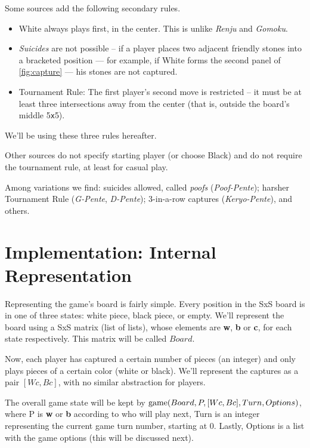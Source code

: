 \documentclass[12pt,a4paper,notitlepage]{article}
\newcommand*{\boardsize}[1]{#1\texttt{x}#1}
\begin{document}
Some sources add the following secondary rules.

\begin{itemize}
	\item White always plays first, in the center.\supercite{pente-renjunu, pente-wikipedia} This is unlike \textit{Renju} and \textit{Gomoku}.
	\item \textsl{Suicides} are not possible -- if a player places two adjacent friendly stones into a bracketed position --- for example, if White forms the second panel of \autoref{fig:capture} --- his stones are not captured.\supercite{pente-renjunu,pente-org,pente-wikipedia,pente-winning-moves}
	\item Tournament Rule: The first player's second move is restricted -- it must be at least three intersections away from the center (that is, outside the board's middle \boardsize{5}).\supercite{pente-net,pente-org,pente-wikipedia,pente-winning-moves}
\end{itemize}

We'll be using these three rules hereafter.

Other sources do not specify starting player (or choose Black) and do not require the tournament rule, at least for casual play. 

Among variations we find: suicides allowed, called \textit{poofs} (\textit{Poof-Pente}); harsher Tournament Rule (\textit{G-Pente}, \textit{D-Pente}); 3-in-a-row captures (\textit{Keryo-Pente}), and others.\supercite{pente-org,pente-net}

\section{Implementation: Internal Representation}
\label{sec:internal}

Representing the game's board is fairly simple. Every position in the SxS board is in one of three states: white piece, black piece, or empty. We'll represent the board using a SxS matrix (list of lists), whose elements are \textbf{w}, \textbf{b} or \textbf{c}, for each state respectively. This matrix will be called $Board$.

Now, each player has captured a certain number of pieces (an integer) and only plays pieces of a certain color (white or black). We'll represent the captures as a pair $[Wc,Bc]$, with no similar abstraction for players.

The overall game state will be kept by $\textup{game}(Board, P, [Wc,Bc], Turn, Options)$, where P is \textbf{w} or \textbf{b} according to who will play next, Turn is an integer representing the current game turn number, starting at 0. Lastly, Options is a list with the game options (this will be discussed next).
\end{document}
